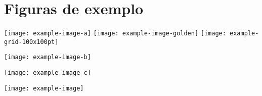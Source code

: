 \chapter{Figuras de exemplo}

\thispagestyle{empty} 


\noindent\texttt{[image: example-image-a]}\qquad
\texttt{[image: example-image-golden]}\qquad
\texttt{[image: example-grid-100x100pt]}

\noindent\texttt{[image: example-image-b]} 

\noindent\texttt{[image: example-image-c]} 

\noindent\texttt{[image: example-image]} 
